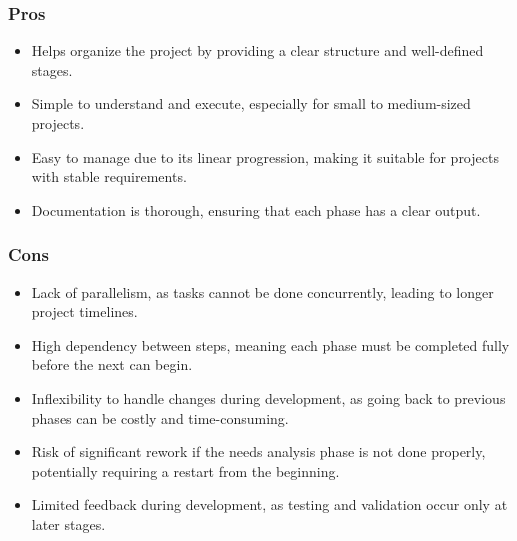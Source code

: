 \subsubsection{Pros}
\begin{itemize}
    \item Helps organize the project by providing a clear structure and well-defined stages.
    \item Simple to understand and execute, especially for small to medium-sized projects.
    \item Easy to manage due to its linear progression, making it suitable for projects with stable requirements.
    \item Documentation is thorough, ensuring that each phase has a clear output.
\end{itemize}

\subsubsection{Cons}
\begin{itemize}
    \item Lack of parallelism, as tasks cannot be done concurrently, leading to longer project timelines.
    \item High dependency between steps, meaning each phase must be completed fully before the next can begin.
    \item Inflexibility to handle changes during development, as going back to previous phases can be costly and time-consuming.
    \item Risk of significant rework if the needs analysis phase is not done properly, potentially requiring a restart from the beginning.
    \item Limited feedback during development, as testing and validation occur only at later stages.
\end{itemize}


\vspace{1cm}
